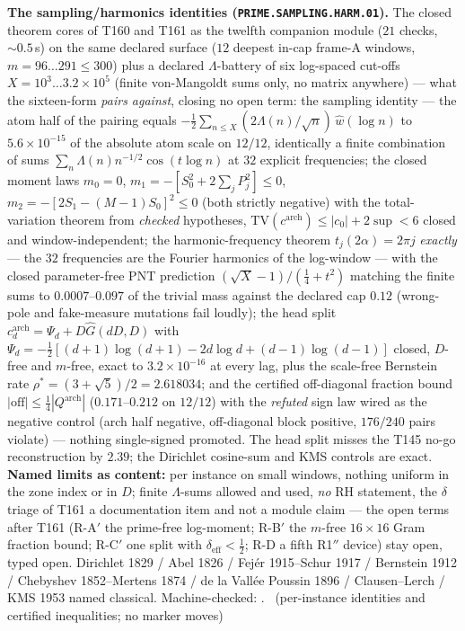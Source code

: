 \documentclass[11pt,a4paper]{article}
\theoremstyle{definition}
\begin{document}
\par\smallskip\noindent\textbf{The sampling/harmonics identities
(\texttt{PRIME.SAMPLING.HARM.01}).}
The closed theorem cores of T160 and T161 as the twelfth companion module
($21$ checks, ${\sim}0.5$\,s) on the same declared surface ($12$ deepest
in-cap frame-A
windows, $m=96\ldots291\le300$) plus a declared $\Lambda$-battery of six
log-spaced cut-offs $X=10^{3}\ldots3.2\times10^{5}$ (finite von-Mangoldt
sums only, no matrix anywhere) --- what the sixteen-form \emph{pairs
against}, closing no open term: the sampling identity --- the atom half
of the pairing equals $-\tfrac12\sum_{n\le X}(2\Lambda(n)/\sqrt n)\,
\widehat w(\log n)$ to $5.6\times10^{-15}$ of the absolute atom scale on
$12/12$, identically a finite combination of sums
$\sum_n\Lambda(n)n^{-1/2}\cos(t\log n)$ at $32$ explicit frequencies;
the closed moment laws $m_0=0$, $m_1=-[S_0^2+2\sum_jP_j^2]\le0$,
$m_2=-[2S_1-(M{-}1)S_0]^2\le0$ (both strictly negative) with the
total-variation theorem from \emph{checked} hypotheses,
$\mathrm{TV}(c^{\mathrm{arch}})\le|c_0|+2\sup<6$ closed and
window-independent; the harmonic-frequency theorem $t_j(2\alpha)=2\pi j$
\emph{exactly} --- the $32$ frequencies are the Fourier harmonics of the
log-window --- with the closed parameter-free PNT prediction
$(\sqrt X-1)/(\tfrac14+t^2)$ matching the finite sums to
$0.0007$--$0.097$ of the trivial mass against the declared cap $0.12$
(wrong-pole and fake-measure mutations fail loudly); the head split
$c^{\mathrm{arch}}_d=\Psi_d+D\widehat G(dD,D)$ with
$\Psi_d=-\tfrac12[(d{+}1)\log(d{+}1)-2d\log d+(d{-}1)\log(d{-}1)]$
closed, $D$-free and $m$-free, exact to $3.2\times10^{-16}$ at every
lag, plus the scale-free Bernstein rate $\rho^*=(3+\sqrt5)/2=2.618034$;
and the certified off-diagonal fraction bound
$|\text{off}|\le\tfrac14|Q^{\mathrm{arch}}|$ ($0.171$--$0.212$ on
$12/12$) with the \emph{refuted} sign law wired as the negative control
(arch half negative, off-diagonal block positive, $176/240$ pairs
violate) --- nothing single-signed promoted. The head split misses the
T145 no-go reconstruction by $2.39$; the Dirichlet cosine-sum and KMS
controls are exact.
\textbf{Named limits as content:} per instance on small windows, nothing
uniform in the zone index or in $D$; finite $\Lambda$-sums allowed and
used, \emph{no} RH statement, the $\delta$ triage of T161 a
documentation item and not a module claim --- the open terms after T161
(R-A$'$ the prime-free log-moment; R-B$'$ the $m$-free $16\times16$ Gram
fraction bound; R-C$'$ one split with $\delta_{\mathrm{eff}}<\tfrac12$;
R-D a fifth R1$''$ device) stay open, typed open.
Dirichlet 1829 / Abel 1826 / Fej\'er 1915--Schur 1917 / Bernstein 1912 /
Chebyshev 1852--Mertens 1874 / de la Vall\'ee Poussin 1896 /
Clausen--Lerch / KMS 1953 named classical. Machine-checked:
.
\mE\ (per-instance identities and certified inequalities; no marker moves)
\par\smallskip
\end{document}
